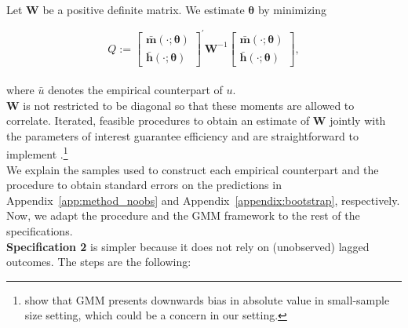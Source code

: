 \noindent Let $\bm{W}$ be a positive definite matrix. We estimate $\bm{\theta}$ by minimizing

\begin{equation}
Q :=  {\begin{bmatrix} {\bm{\bar{m}} \left( \cdot ; \bm{\theta} \right) }  \\ {\bm{\bar{h}} \left( \cdot ; \bm{\theta} \right) }  \end{bmatrix}}^{'}
\bm{W} ^{-1}{\begin{bmatrix} {\bm{\bar{m}} \left( \cdot ; \bm{\theta} \right) }  \\ {\bm{\bar{h}} \left( \cdot ; \bm{\theta} \right) }  \end{bmatrix}}, \label{eq:wloss}
\end{equation}\\

\noindent where $\bar{u}$ denotes the empirical counterpart of $u$.\\

\noindent $\bm{W}$ is not restricted to be diagonal so that these moments are allowed to correlate. Iterated, feasible procedures to obtain an estimate of $\bm{W}$ jointly with the parameters of interest guarantee efficiency and are straightforward to implement \citep{Hansen_1982_Econometrica,Amemiya_1985_advanced}.\footnote{\citet{Altonji_Segal_1996_JoBaES} show that GMM presents downwards bias in absolute value in small-sample size setting, which could be a concern in our setting.}\\

\noindent We explain the samples used to construct each empirical counterpart and the procedure to obtain standard errors on the predictions in Appendix~\ref{app:method_noobs} and Appendix~\ref{appendix:bootstrap}, respectively.\\

\noindent Now, we adapt the procedure and the GMM framework to the rest of the specifications.\\

\noindent \textbf{Specification 2} is simpler because it does not rely on (unobserved) lagged outcomes. The steps are the following: 


